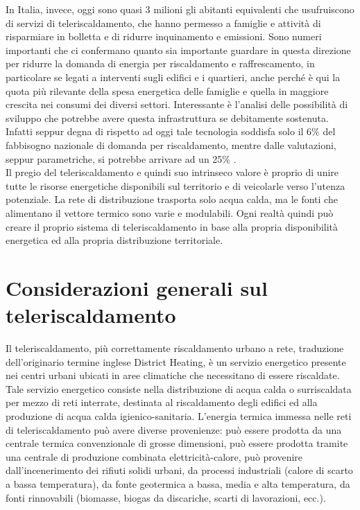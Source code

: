 \documentclass[laurea,oneside,11pt]{USiena_tesiLM}
\begin{document}
In Italia, invece, oggi sono quasi 3 milioni gli abitanti equivalenti che usufruiscono di servizi di teleriscaldamento, che hanno permesso a famiglie e attività di risparmiare in bolletta e di ridurre inquinamento e emissioni. Sono numeri importanti che ci confermano quanto sia importante guardare in questa direzione per ridurre la domanda di energia per riscaldamento e raffrescamento, in particolare se legati a interventi sugli edifici e i quartieri, anche perché è qui la quota più rilevante della spesa energetica delle famiglie e quella in maggiore crescita nei consumi dei diversi settori.
Interessante è l'analisi delle possibilità di sviluppo che potrebbe avere questa infrastruttura se debitamente sostenuta. Infatti seppur degna di rispetto ad oggi tale tecnologia soddisfa solo il 6\% del fabbisogno nazionale di domanda per riscaldamento, mentre dalle valutazioni, seppur parametriche, si potrebbe arrivare ad un 25\% .\\

 Il pregio del teleriscaldamento e quindi suo intrinseco valore è proprio di unire tutte le risorse energetiche disponibili sul territorio e di veicolarle verso l'utenza potenziale. La rete di distribuzione trasporta solo acqua calda, ma le fonti che alimentano il vettore termico sono varie e modulabili. Ogni realtà quindi può creare il proprio sistema di teleriscaldamento in base alla propria disponibilità energetica ed alla propria distribuzione territoriale.


\section{Considerazioni generali sul teleriscaldamento}
Il teleriscaldamento, più correttamente riscaldamento urbano a rete, traduzione dell'originario termine inglese District Heating, è un servizio energetico presente nei centri urbani ubicati in aree climatiche che necessitano di essere riscaldate.
Tale servizio energetico consiste nella distribuzione di acqua calda o surriscaldata per mezzo di reti interrate, destinata al riscaldamento degli edifici ed alla produzione di acqua calda igienico-sanitaria.
L'energia termica immessa nelle reti di teleriscaldamento può avere diverse provenienze: può essere prodotta da una centrale termica convenzionale di grosse dimensioni, può essere prodotta tramite una centrale di produzione combinata elettricità-calore, può provenire dall'incenerimento dei rifiuti solidi urbani, da processi industriali (calore di scarto a bassa temperatura), da fonte geotermica a bassa, media e alta temperatura, da fonti rinnovabili (biomasse, biogas da discariche, scarti di lavorazioni, ecc.).\\
\end{document}
